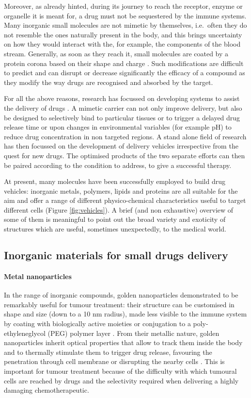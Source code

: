 Moreover, as already hinted, during its journey to reach the receptor, enzyme or organelle it is meant for, a drug must not be sequestered by the immune systems. Many inorganic small molecules are not mimetic by themselves, i.e.\ often they do not resemble the ones naturally present in the body, and this brings uncertainty on how they would interact with the, for example, the components of the blood stream. Generally, as soon as they reach it, small molecules are coated by a protein corona based on their shape and charge \cite{Krol2012}. Such modifications are difficult to predict and can disrupt or decrease significantly the efficacy of a compound as they modify the way drugs are recognised and absorbed by the target. 

For all the above reasons, research has focussed on developing systems to assist the delivery of drugs \cite{Jain2016, Pattni2015, Mitragotri2014}. A mimetic carrier can not only improve delivery, but also be designed to selectively bind to particular tissues or to trigger a delayed drug release time or upon changes in environmental variables (for example pH) to reduce drug concentration in non targeted regions. A stand alone field of research has then focussed on the development of delivery vehicles irrespective from the quest for new drugs. The optimised products of the two separate efforts can then be paired according to the condition to address, to give a successful therapy.

At present, many molecules have been successfully employed to build drug vehicles: inorganic metals, polymers, lipids and proteins are all suitable for the aim and offer a range of different physico-chemical characteristics useful to target different cells \cite{Hughes2005} (Figure \ref{fig:vehicles}). A brief (and non exhaustive) overview of some of them is meaningful to point out the broad variety and exoticity of structures which are useful, sometimes unexpectedly, to the medical world.


\subsection{Inorganic materials for small drugs delivery}

\paragraph{Metal nanoparticles} In the range of inorganic compounds, golden nanoparticles demonstrated to be remarkably useful for tumour treatment: their structure can be customised in shape and size (down to a 10 nm radius), made less visible to the immune system by coating with biologically active moieties or conjugation to a poly-ethyleneglycol (PEG) polymer layer \cite{Singh2018}. From their metallic nature, golden nanoparticles inherit optical properties that allow to track them inside the body and to thermally stimulate them to trigger drug release, favouring the penetration through cell membrane or disrupting the nearby cells \cite{Boisselier2009}. This is important for tumour treatment because of the difficulty with which tumoural cells are reached by drugs and the selectivity required when delivering a highly damaging chemotherapeutic.

